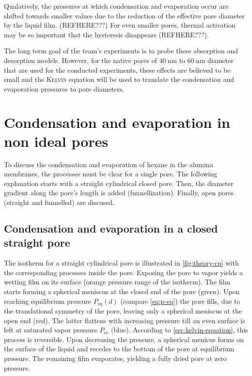 \documentclass[../thesis.tex]{subfiles}
\begin{document}
      Qualatively, the pressures at which condensation and evaporation occur are shifted towards smaller values due to the reduction of the effective pore diameter by the liquid film. (REFHERE???) For even smaller pores, thermal activation may be so important that the hysteresis disappears (REFHERE???).
      \medskip

      The long term goal of the team's experiments is to probe these absorption and desorption models. However, for the native pores of $\SI{40}{\nano\meter}$ to $\SI{60}{\nano\meter}$ diameter that are used for the conducted experiments, these effects are believed to be small and the \textsc{Kelvin} equation will be used to translate the condensation and evaporation pressures to pore diameters.


    \section{Condensation and evaporation in non ideal pores}
    \label{eq:cond-evap-non-ideal-pore}

      To discuss the condensation and evaporation of hexane in the alumina membranes, the processes must be clear for a single pore. The following explanation starts with a straight cylindrical closed pore. Then, the diameter gradient along the pore's length is added (funnellization). Finally, open pores (straight and funnelled) are discused.

      \subsection{Condensation and evaporation in a closed straight pore}
      \label{subsec:closed-pore-theory}

        The isotherm for a straight cylindrical pore is illustrated in \cref{fig:theory-cp} with the corresponding processes inside the pore. Exposing the pore to vapor yields a wetting film on its surface (orange pressure range of the isotherm). The film starts forming a spherical meniscus at the closed end of the pore (green). Upon reaching equilibrium pressure $P_\mathrm{eq}(d)$ (compare \cref{eq:p-eq}) the pore fills, due to the translational symmetry of the pore, leaving only a spherical meniscus at the open end (red). The latter flattens with increasing pressure till an even surface is left at saturated vapor pressure $P_\mathrm{sv}$ (blue). According to \cref{sec:kelvin-equation}, this process is reversible. Upon decreasing the pressure, a spherical menicus forms on the surface of the liquid and recedes to the bottom of the pore at equilibrium pressure. The remaining film evaporates, yielding a fully dried pore at zero pressure.
\end{document}
